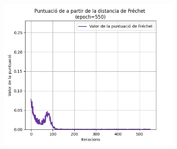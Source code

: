 \begin{figure}[H]
\begin{subfigure}[b]{.32\linewidth}
		\includegraphics[width=\linewidth]{figures/data/FD_score_3.png}
		\caption{}
	\end{subfigure}
	

\end{figure}
